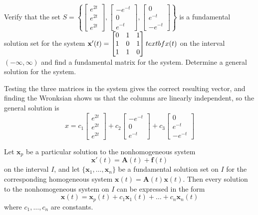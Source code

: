 \documentclass[../diffeq.tex]{subfiles}
\begin{document}
\begin{example}
    Verify that the set $S=\left\{ \begin{bmatrix}
        e^{2t}\\e^{2t}\\e^{2t}
    \end{bmatrix}, \begin{bmatrix}
        -e^{-t}\\0\\e^{-t}
    \end{bmatrix},\begin{bmatrix}
        0\\e^{-t}\\-e^{-t}
    \end{bmatrix}\right\}$ is a fundamental solution set for the system 
    $\textbf{x}'(t)=\begin{bmatrix}
        0 & 1 & 1\\
        1 & 0 & 1\\
        1 & 1 & 0
    \end{bmatrix}\\textbf{x}(t)$ on the interval $(-\infty,\infty)$ and find a fundamental matrix for the system. Determine a general solution for the system.

    Testing the three matrices in the system gives the correct resulting vector, and finding the Wronksian shows us that the columns are linearly independent, so the general solution is 
    \[ x=c_1\begin{bmatrix}
        e^{2t}\\e^{2t}\\e^{2t}
    \end{bmatrix}+c_2\begin{bmatrix}
        -e^{-t}\\0\\e^{-t}
    \end{bmatrix}+c_3\begin{bmatrix}
        0\\e^{-t}\\-e^{-t}
    \end{bmatrix} \]
\end{example}

\begin{theorem}
    Let $\textbf{x}_p$ be a particular solution to the nonhomogeneous system 
    \[ \textbf{x}'(t)=\textbf{A}(t)+\textbf{f}(t) \]
    on the interval $I$, and let $\{\textbf{x}_1,\dots,\textbf{x}_n\}$ be a fundamental solution set on $I$ for the corresponding homogeneous system $\textbf{x}(t)=\textbf{A}(t)\textbf{x}(t)$.
    Then every solution to the nonhomogeneous system on $I$ can be expressed in the form 
    \[ \textbf{x}(t)=\textbf{x}_p(t)+c_1\textbf{x}_1(t)+\dots + c_n\textbf{x}_n(t)\]
    where $c_1,\dots,c_n$ are constants.
\end{theorem}
\end{document}

